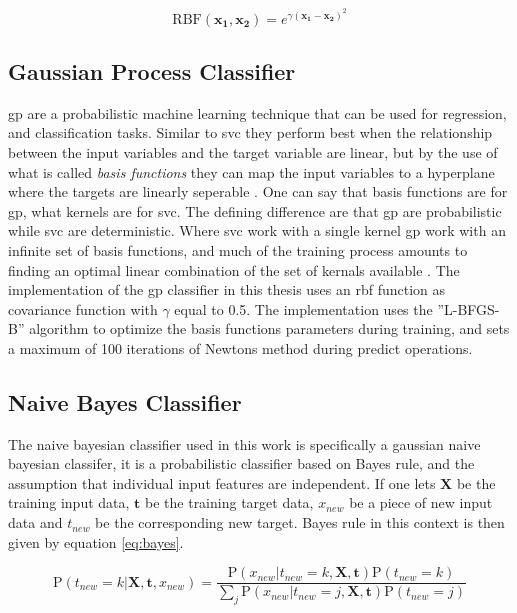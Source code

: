 \begin{equation}
    \mathrm{RBF}(\mathbf{x_1}, \mathbf{x_2}) = e^{\gamma \left ( \mathbf{x_1} - \mathbf{x_2} \right )^2}
    \label{eq:rbf}
\end{equation}

\subsection{Gaussian Process Classifier}
\acrfull{gp} are a probabilistic machine learning technique that can be used for regression, and classification tasks. Similar to \acrshort{svc} they perform best when the relationship between the input variables and the target variable are linear, but by the use of what is called \textit{basis functions} they can map the input variables to a hyperplane where the targets are linearly seperable \cite{GP_book}. One can say that basis functions are for \acrshort{gp}, what kernels are for \acrshort{svc}. The defining difference are that \acrshort{gp} are probabilistic while \acrshort{svc} are deterministic. Where \acrshort{svc} work with a single kernel \acrshort{gp} work with an infinite set of basis functions, and much of the training process amounts to finding an optimal linear combination of the set of kernals available \cite{GP_book}. The implementation of the \acrshort{gp} classifier in this thesis uses an \acrshort{rbf} function as covariance function with $\gamma$ equal to 0.5. The implementation uses the ''L-BFGS-B'' algorithm to optimize the basis functions parameters during training, and sets a maximum of 100 iterations of Newtons method during predict operations. 

\subsection{Naive Bayes Classifier}
The naive bayesian classifier used in this work is specifically a gaussian naive bayesian classifer, it is a probabilistic classifier based on Bayes rule, and the assumption that individual input features are independent. If one lets $\mathbf{X}$ be the training input data, $\mathbf{t}$ be the training target data, $x_{new}$ be a piece of new input data and $t_{new}$ be the corresponding new target. Bayes rule in this context is then given by equation \eqref{eq:bayes}.

\begin{equation}
    \mathrm{P} \left(t_{new}=k|\mathbf{X},\mathbf{t},x_{new}\right)=\frac{\mathrm{P}\left(x_{new}|t_{new}=k,\mathbf{X},\mathbf{t}\right)\mathrm{P}\left(t_{new}=k\right)}{\sum_{j} \mathrm{P}\left(x_{new}|t_{new}=j,\mathbf{X},\mathbf{t}\right)\mathrm{P}\left(t_{new}=j\right)}
    \label{eq:bayes}
\end{equation}

